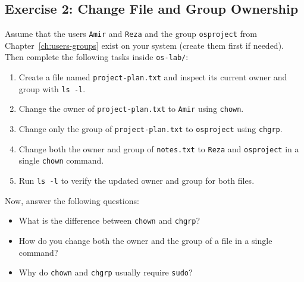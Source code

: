 \subsection{Exercise 2: Change File and Group Ownership}
Assume that the users \texttt{Amir} and \texttt{Reza} and the group \texttt{osproject} from Chapter~\ref{ch:users-groups} exist on your system (create them first if needed). Then complete the following tasks inside \texttt{os-lab/}:
\begin{enumerate}
	\item Create a file named \texttt{project-plan.txt} and inspect its current owner and group with \texttt{ls -l}.
	\item Change the owner of \texttt{project-plan.txt} to \texttt{Amir} using \texttt{chown}.
	\item Change only the group of \texttt{project-plan.txt} to \texttt{osproject} using \texttt{chgrp}.
	\item Change both the owner and group of \texttt{notes.txt} to \texttt{Reza} and \texttt{osproject} in a single \texttt{chown} command.
	\item Run \texttt{ls -l} to verify the updated owner and group for both files.
\end{enumerate}

Now, answer the following questions:
\begin{itemize}
	\item What is the difference between \texttt{chown} and \texttt{chgrp}?
	\item How do you change both the owner and the group of a file in a single command?
	\item Why do \texttt{chown} and \texttt{chgrp} usually require \texttt{sudo}?
\end{itemize}

